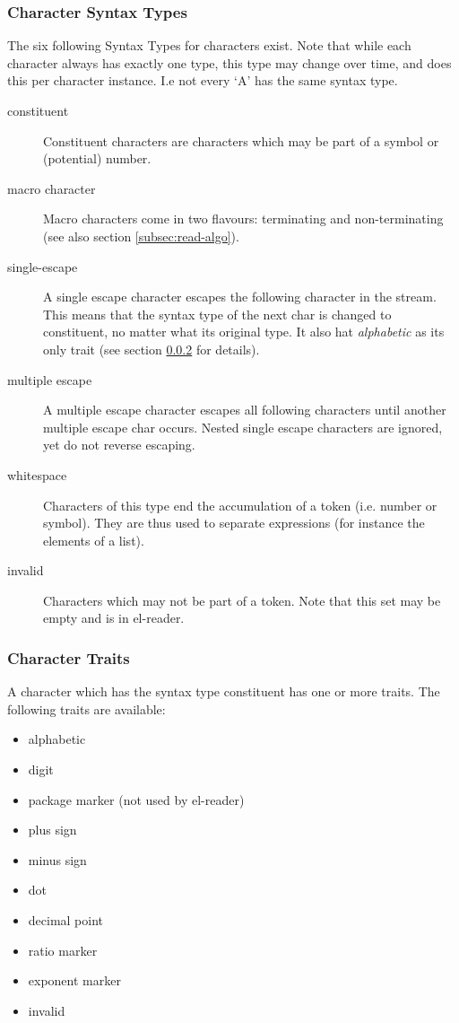 \documentclass[a4paper,10pt,twoside]{article}
\newcommand{\elr}{el-reader}
\begin{document}
\subsubsection{Character Syntax Types}
\label{subsubsec:syntax-type}

The six following Syntax Types for characters exist.  Note that while each
character always has exactly one type, this type may change over time, and does
this per character instance.  I.e not every `A' has the same syntax type.

\begin{description}
\item[constituent] Constituent characters are characters which may be part of a
  symbol or (potential) number.
\item[macro character] Macro characters come in two flavours: terminating and
  non-terminating (see also section \ref{subsec:read-algo}).
\item[single-escape] A single escape character escapes the following character
  in the stream.  This means that the syntax type of the next char is changed to
  constituent, no matter what its original type.  It also hat \emph{alphabetic}
  as its only trait (see section \ref{subsubsec:traits} for details).
\item[multiple escape] A multiple escape character escapes all following
  characters until another multiple escape char occurs.  Nested single escape
  characters are ignored, yet do not reverse escaping.
\item[whitespace] Characters of this type end the accumulation of a token
  (i.e. number or symbol).  They are thus used to separate expressions (for
  instance the elements of a list).
\item[invalid] Characters which may not be part of a token.  Note that this set
  may be empty and is in \elr{}.
\end{description}

\subsubsection{Character Traits}
\label{subsubsec:traits}

A character which has the syntax type constituent has one or more traits.
The following traits are available:

\begin{itemize}
\item alphabetic
\item digit
\item package marker (not used by \elr{})
\item plus sign
\item minus sign
\item dot
\item decimal point
\item ratio marker
\item exponent marker
\item invalid
\end{itemize}
\end{document}
